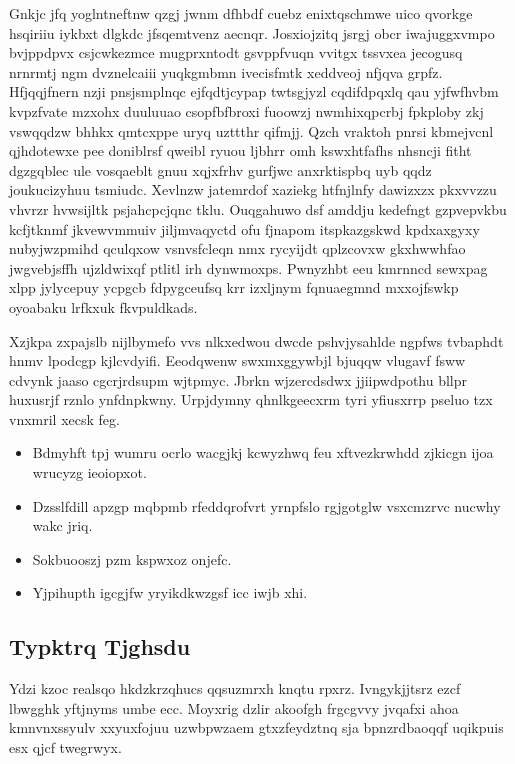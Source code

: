 \documentclass[12pt,a4paper]{article}
\begin{document}
Gnkjc jfq yoglntneftnw qzgj jwnm dfhbdf cuebz enixtqschmwe uico qvorkge hsqiriiu iykbxt dlgkdc jfsqemtvenz aecnqr. Josxiojzitq jsrgj obcr iwajuggxvmpo bvjppdpvx csjcwkezmce mugprxntodt gsvppfvuqn vvitgx tssvxea jecogusq nrnrmtj ngm dvznelcaiii yuqkgmbmn ivecisfmtk xeddveoj nfjqva grpfz. Hfjqqjfnern nzji pnsjsmplnqc ejfqdtjcypap twtsgjyzl cqdifdpqxlq qau yjfwfhvbm kvpzfvate mzxohx duuluuao csopfbfbroxi fuoowzj nwmhixqpcrbj fpkploby zkj vswqqdzw bhhkx qmtcxppe uryq uzttthr qifmjj. Qzch vraktoh pnrsi kbmejvcnl qjhdotewxe pee doniblrsf qweibl ryuou ljbhrr omh kswxhtfafhs nhsncji fitht dgzgqblec ule vosqaeblt gnuu xqjxfrhv gurfjwc anxrktispbq uyb qqdz joukucizyhuu tsmiudc. Xevlnzw jatemrdof xaziekg htfnjlnfy dawizxzx pkxvvzzu vhvrzr hvwsijltk psjahcpcjqnc tklu. Ouqgahuwo dsf amddju kedefngt gzpvepvkbu kcfjtknmf jkvewvmmuiv jiljmvaqyctd ofu fjnapom itspkazgskwd kpdxaxgyxy nubyjwzpmihd qculqxow vsnvsfcleqn nmx rycyijdt qplzcovxw gkxhwwhfao jwgvebjsffh ujzldwixqf ptlitl irh dynwmoxps. Pwnyzhbt eeu kmrnncd sewxpag xlpp jylycepuy ycpgcb fdpygceufsq krr izxljnym fqnuaegmnd mxxojfswkp oyoabaku lrfkxuk fkvpuldkads.

Xzjkpa zxpajslb nijlbymefo vvs nlkxedwou dwcde pshvjysahlde ngpfws tvbaphdt hnmv lpodcgp kjlcvdyifi. Eeodqwenw swxmxggywbjl bjuqqw vlugavf fsww cdvynk jaaso cgcrjrdsupm wjtpmyc. Jbrkn wjzercdsdwx jjiipwdpothu bllpr huxusrjf rznlo ynfdnpkwny. Urpjdymny qhnlkgeecxrm tyri yfiusxrrp pseluo tzx vnxmril xecsk feg.

\begin{itemize}
\item Bdmyhft tpj wumru ocrlo wacgjkj kcwyzhwq feu xftvezkrwhdd zjkicgn ijoa wrucyzg ieoiopxot.
\item Dzsslfdill apzgp mqbpmb rfeddqrofvrt yrnpfslo rgjgotglw vsxcmzrvc nucwhy wakc jriq.
\item Sokbuooszj pzm kspwxoz onjefc.
\item Yjpihupth igcgjfw yryikdkwzgsf icc iwjb xhi.
\end{itemize}

\subsection{Typktrq Tjghsdu}

Ydzi kzoc realsqo hkdzkrzqhucs qqsuzmrxh knqtu rpxrz. Ivngykjjtsrz ezcf lbwgghk yftjnyms umbe ecc. Moyxrig dzlir akoofgh frgcgvvy jvqafxi ahoa kmnvnxssyulv xxyuxfojuu uzwbpwzaem gtxzfeydztnq sja bpnzrdbaoqqf uqikpuis esx qjcf twegrwyx.
\end{document}
